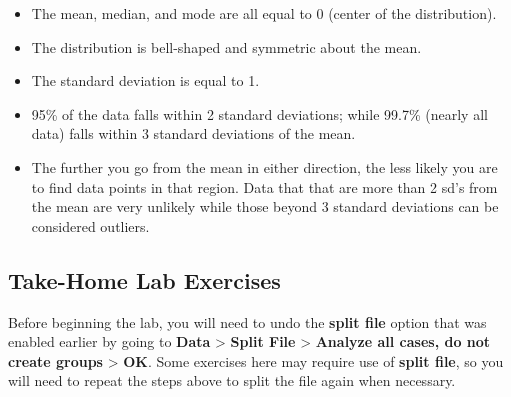 \documentclass[
  letterpaper,
  DIV=11,
  numbers=noendperiod]{scrartcl}
\providecommand{\tightlist}{%
  \setlength{\itemsep}{0pt}\setlength{\parskip}{0pt}}\usepackage{longtable,booktabs,array}
\begin{document}
\begin{tcolorbox}[enhanced jigsaw, opacityback=0, coltitle=black, title=\textcolor{quarto-callout-note-color}{\faInfo}\hspace{0.5em}{Important Notes about the Standard Normal Distribution}, titlerule=0mm, rightrule=.15mm, toprule=.15mm, opacitybacktitle=0.6, colbacktitle=quarto-callout-note-color!10!white, colback=white, bottomtitle=1mm, arc=.35mm, toptitle=1mm, bottomrule=.15mm, colframe=quarto-callout-note-color-frame, breakable, leftrule=.75mm, left=2mm]

\begin{itemize}
\tightlist
\item
  The mean, median, and mode are all equal to 0 (center of the
  distribution).
\item
  The distribution is bell-shaped and symmetric about the mean.
\item
  The standard deviation is equal to 1.
\item
  95\% of the data falls within 2 standard deviations; while 99.7\%
  (nearly all data) falls within 3 standard deviations of the mean.
\item
  The further you go from the mean in either direction, the less likely
  you are to find data points in that region. Data that that are more
  than 2 sd's from the mean are very unlikely while those beyond 3
  standard deviations can be considered outliers.
\end{itemize}

\end{tcolorbox}

\subsection{Take-Home Lab Exercises}\label{take-home-lab-exercises}

Before beginning the lab, you will need to undo the \textbf{split file}
option that was enabled earlier by going to \textbf{Data} \textgreater{}
\textbf{Split File} \textgreater{} \textbf{Analyze all cases, do not
create groups} \textgreater{} \textbf{OK}. Some exercises here may
require use of \textbf{split file}, so you will need to repeat the steps
above to split the file again when necessary.
\end{document}

